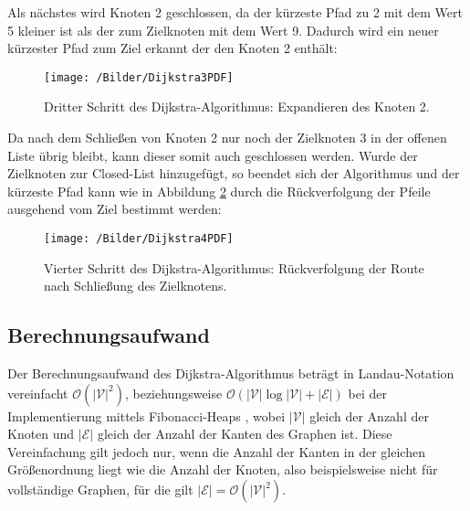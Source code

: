 		Als nächstes wird Knoten 2 geschlossen, da der kürzeste Pfad zu 2 mit dem Wert 5 kleiner ist als der zum Zielknoten mit dem Wert 9. Dadurch wird ein neuer kürzester Pfad zum Ziel erkannt der den Knoten 2 enthält:
		
		\begin{figure}[H]
			\centering
			\texttt{[image: /Bilder/Dijkstra3PDF]}
			\vspace{0.2cm}
			\caption{Dritter Schritt des Dijkstra-Algorithmus: Expandieren des Knoten 2.}\label{Dijkstra3}
		\end{figure}
		
		Da nach dem Schließen von Knoten 2 nur noch der Zielknoten 3 in der offenen Liste übrig bleibt, kann dieser somit auch geschlossen werden. Wurde der Zielknoten zur Closed-List hinzugefügt, so beendet sich der Algorithmus und der kürzeste Pfad kann wie in Abbildung \ref{Dijkstra4} durch die Rückverfolgung  der Pfeile ausgehend vom Ziel bestimmt werden:
		
		\begin{figure}[H]
			\centering
			\texttt{[image: /Bilder/Dijkstra4PDF]}
			\vspace{0.2cm}
			\caption{Vierter Schritt des Dijkstra-Algorithmus: Rückverfolgung der Route nach Schließung des Zielknotens.}\label{Dijkstra4}
		\end{figure}
			
	\subsection{Berechnungsaufwand}
		Der Berechnungsaufwand des Dijkstra-Algorithmus beträgt in Landau-Notation vereinfacht $\mathcal{O}(\lvert \mathcal{V}\rvert ^2)$, beziehungsweise $\mathcal{O}(\lvert \mathcal{V}\rvert  \log \lvert \mathcal{V}\rvert + \lvert \mathcal{E}\rvert) $ bei der Implementierung mittels Fibonacci-Heaps \cite{Fredman1984}, wobei  $\lvert \mathcal{V}\rvert$ gleich der Anzahl der Knoten  und $\lvert \mathcal{E}\rvert$ gleich der Anzahl der Kanten des Graphen ist. Diese Vereinfachung gilt jedoch nur, wenn die Anzahl der Kanten in der gleichen Größenordnung liegt wie die Anzahl der Knoten, also beispielsweise nicht für vollständige Graphen, für die gilt $\lvert \mathcal{E}\rvert =\mathcal{O}(\lvert \mathcal{V}\rvert ^2)$.
	
